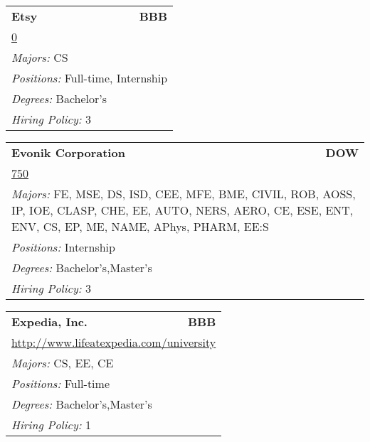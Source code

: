 \documentclass[twoside]{article}
\begin{document}
\begin{center}
\begin{multicols}{3}
\begin{FlushLeft}
\begin{minipage}{.9\columnwidth}\begin{tabularx}{.95\columnwidth}{Xr}
                 {\Large\bf Etsy} & {\Large\bf BBB}\\
    \multicolumn{2}{p{.95\columnwidth}}{\url{0}}\\
    \multicolumn{2}{p{.95\columnwidth}}{\emph{Majors:} CS}\\
    \multicolumn{2}{p{.95\columnwidth}}{\emph{Positions:} Full-time, Internship}\\
    \multicolumn{2}{p{.95\columnwidth}}{\emph{Degrees:} Bachelor's}\\
    \multicolumn{2}{p{.95\columnwidth}}{\emph{Hiring Policy:} 3}\\
    \end{tabularx}
    
\end{minipage}
 
\begin{minipage}{.9\columnwidth}\begin{tabularx}{.95\columnwidth}{Xr}
                 {\Large\bf Evonik Corporation} & {\Large\bf DOW}\\
    \multicolumn{2}{p{.95\columnwidth}}{\url{750}}\\
    \multicolumn{2}{p{.95\columnwidth}}{\emph{Majors:} FE, MSE, DS, ISD, CEE, MFE, BME, CIVIL, ROB, AOSS, IP, IOE, CLASP, CHE, EE, AUTO, NERS, AERO, CE, ESE, ENT, ENV, CS, EP, ME, NAME, APhys, PHARM, EE:S}\\
    \multicolumn{2}{p{.95\columnwidth}}{\emph{Positions:} Internship}\\
    \multicolumn{2}{p{.95\columnwidth}}{\emph{Degrees:} Bachelor's,Master's}\\
    \multicolumn{2}{p{.95\columnwidth}}{\emph{Hiring Policy:} 3}\\
    \end{tabularx}
    
\end{minipage}
 
\begin{minipage}{.9\columnwidth}\begin{tabularx}{.95\columnwidth}{Xr}
                 {\Large\bf Expedia, Inc.} & {\Large\bf BBB}\\
    \multicolumn{2}{p{.95\columnwidth}}{\url{http://www.lifeatexpedia.com/university}}\\
    \multicolumn{2}{p{.95\columnwidth}}{\emph{Majors:} CS, EE, CE}\\
    \multicolumn{2}{p{.95\columnwidth}}{\emph{Positions:} Full-time}\\
    \multicolumn{2}{p{.95\columnwidth}}{\emph{Degrees:} Bachelor's,Master's}\\
    \multicolumn{2}{p{.95\columnwidth}}{\emph{Hiring Policy:} 1}\\
    \end{tabularx}
    

\end{minipage}
\end{FlushLeft}
\end{multicols}
\end{center}
\end{document}
